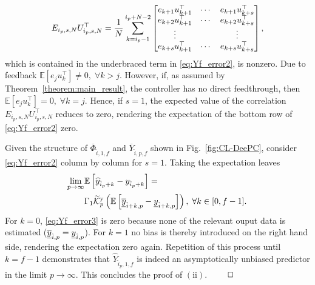 \begin{align}
E_{i_p,s,N}U_{i_p,s,N}^\top =
    \frac{1}{N}\sum\limits_{k=i_p-1}^{i_p+N-2}
    \begin{bmatrix}
        e_{k+1} u_{k+1}^\top & \cdots & e_{k+1} u_{k+s}^\top\\
        e_{k+2} u_{k+1}^\top & \cdots & e_{k+2} u_{k+s}^\top\\
        \vdots &  & \vdots\\
        e_{k+s}u_{k+1}^\top & \cdots & e_{k+s}u_{k+s}^\top
    \end{bmatrix},\notag%
\end{align}
which is contained in the underbraced term in \eqref{eq:Yf_error2}, is nonzero. Due to feedback $\mathbb{E}[e_j u_k^\top]\neq 0,\;\forall k>j$. However, if, as assumed by Theorem~\ref{theorem:main_result}, the controller has no direct feedthrough, then $\mathbb{E}[e_j u_k^\top]= 0,\;\forall k=j$. Hence, if $s=1$, the expected value of the correlation $E_{i_p,s,N}U_{i_p,s,N}^\top$ reduces to zero, rendering the expectation of the bottom row of \eqref{eq:Yf_error2} zero.

Given the structure of $\overline{\Phi}_{\hat{i},1,f}$ and $\overline{Y}_{\hat{i},p,f}$ shown in Fig.~\ref{fig:CL-DeePC}, consider \eqref{eq:Yf_error2} column by column for $s=1$. Taking the expectation leaves
\begin{align}%
\begin{split}
    \mkern-3mu\lim_{p\rightarrow\infty} &\mathbb{E}\left[\widehat{y}_{\hat{i}_p+k}-y_{\hat{i}_p+k}\right] = \\ &\Gamma_1\tKp{y}\left(\mathbb{E}\left[\datavec{\overline{y}}{\hat{i}+k,p}-\datavec{y}{\hat{i}+k,p}\right]\right),\;\forall k\in[0,f-1].
\end{split}
\end{align}
For $k=0$, \eqref{eq:Yf_error3} is zero because none of the relevant ouput data is estimated ($\underline{\overline{y}}_{\hat{i},p}=\underline{y}_{\hat{i},p}$). For $k=1$ no bias is thereby introduced on the right hand side, rendering the expectation zero again. Repetition of this process until $k=f-1$ demonstrates that $\widehat{Y}_{\hat{i}_p,1,f}$ is indeed an asymptotically unbiased predictor in the limit $p\rightarrow\infty$. This concludes the proof of $\mathrm{(ii)}$. $\hfill\qed$

